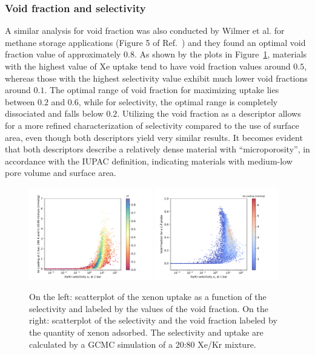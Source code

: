 \documentclass[main.tex]{subfiles}
\begin{document}
\subsubsection{Void fraction and selectivity}

A similar analysis for void fraction was also conducted by Wilmer et al. for methane storage applications (Figure 5 of Ref.~\cite{Wilmer_2012}) and they found an optimal void fraction value of approximately $0.8$. As shown by the plots in Figure~\ref{fgr:vol}, materials with the highest value of Xe uptake tend to have void fraction values around $0.5$, whereas those with the highest selectivity value exhibit much lower void fractions around $0.1$. The optimal range of void fraction for maximizing uptake lies between $0.2$ and $0.6$, while for selectivity, the optimal range is completely dissociated and falls below $0.2$. Utilizing the void fraction as a descriptor allows for a more refined characterization of selectivity compared to the use of surface area, even though both descriptors yield very similar results. It becomes evident that both descriptors describe a relatively dense material with ``microporosity'', in accordance with the IUPAC definition\autocite{Sing_1985}, indicating materials with medium-low pore volume and surface area.

\begin{figure}[ht]
  \centering
  \includegraphics[width=0.48\textwidth]{figures/2-thermo/Scatterplot_uptake_selectivity_vol.pdf}
  \includegraphics[width=0.48\textwidth]{figures/2-thermo/Scatterplot_vol_selectivity.pdf}
  \caption{On the left: scatterplot of the xenon uptake as a function of the selectivity and labeled by the values of the void fraction. On the right: scatterplot of the selectivity and the void fraction labeled by the quantity of xenon adsorbed. The selectivity and uptake are calculated by a GCMC simulation of a 20:80 Xe/Kr mixture.}\label{fgr:vol}
\end{figure}
\end{document}
